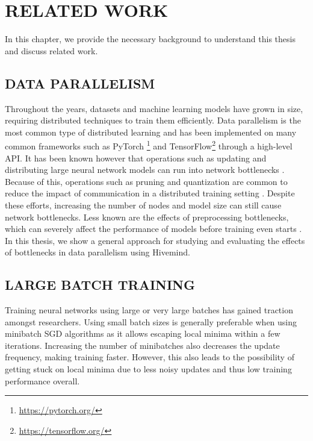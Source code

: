\chapter{RELATED WORK}\label{chapter:related-work}
In this chapter, we provide the necessary background to understand this thesis and discuss related work.

\section{DATA PARALLELISM}
Throughout the years, datasets and machine learning models have grown in size, requiring distributed techniques to train them efficiently.
Data parallelism is the most common type of distributed learning and has been implemented on many common frameworks such as PyTorch \footnote{\href{https://pytorch.org/}{https://pytorch.org/}} and TensorFlow\footnote{\href{https://tensorflow.org/}{https://tensorflow.org/}} through a high-level API.
It has been known however that operations such as updating and distributing large neural network models can run into network bottlenecks \cite{10.48550/arxiv.1705.08741, DBLP:journals/corr/abs-2003-11316, 10.5555/2999134.2999271, DBLP:journals/corr/abs-1811-03600}.
Because of this, operations such as pruning and quantization are common to reduce the impact of communication in a distributed training setting \cite{10.48550/arxiv.2003.03033, 10.48550/arxiv.1510.00149}.
Despite these efforts, increasing the number of nodes and model size can still cause network bottlenecks.
Less known are the effects of preprocessing bottlenecks, which can severely affect the performance of models before training even starts \cite{isenko2022bottleneck, 10.1145/3448016.3457566}.
In this thesis, we show a general approach for studying and evaluating the effects of bottlenecks in data parallelism using Hivemind.

\section{LARGE BATCH TRAINING}
Training neural networks using large or very large batches \cite{DBLP:journals/corr/KeskarMNST16, 10.48550/arxiv.1705.08741} has gained traction amongst researchers.
Using small batch sizes is generally preferable when using minibatch SGD algorithms as it allows escaping local minima within a few iterations.
Increasing the number of minibatches also decreases the update frequency, making training faster.
However, this also leads to the possibility of getting stuck on local minima due to less noisy updates and thus low training performance overall.

